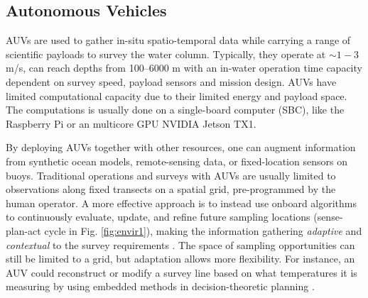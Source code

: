 \documentclass[aoas]{imsart}
\begin{document}




\subsection{Autonomous Vehicles}

AUVs are used to gather in-situ spatio-temporal data while carrying a
range of scientific payloads to survey the water column. Typically,
they operate at $\sim 1-3$ m/s, can reach depths from 100--6000 m with
an in-water operation time capacity dependent on survey speed, payload
sensors and mission design. AUVs have limited computational capacity due to their limited energy and payload space. The computations is usually done on a single-board computer (SBC), like the Raspberry Pi or an multicore GPU NVIDIA Jetson TX1. 

By deploying AUVs together with other
resources, one can augment information from synthetic ocean models,
remote-sensing data, or fixed-location sensors on buoys. Traditional
operations and surveys with AUVs are usually limited to observations
along fixed transects on a spatial grid, pre-programmed by the human
operator. A more effective approach is to instead use onboard algorithms to continuously evaluate,
update, and refine future sampling locations (sense-plan-act cycle in Fig. \ref{fig:envir1}), making the information
gathering \emph{adaptive} and \emph{contextual} to the survey
requirements \citep{das11b,fossum18b,fossuminformation}. The space of
sampling opportunities can still be limited to a grid, but adaptation
allows more flexibility. For instance, an AUV could reconstruct or
modify a survey line based on what temperatures it is measuring by
using embedded methods in decision-theoretic planning
\citep{py10,Rajan12,Rajan12b}.

\end{document}
